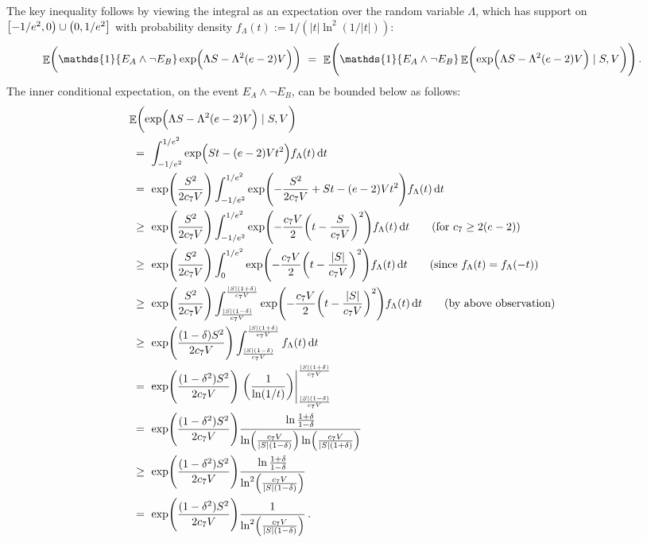 \documentclass[11pt]{article}
\DeclareMathOperator{\E}{\mathbb{E}}
\theoremstyle{remark}
\theoremstyle{definition}
\renewcommand\abs[1]{|#1|} %
\newcommand\ind[1]{\ensuremath{\mathds{1}\{#1\}}}
\newcommand\Parens[1]{\mleft(#1\mright)}
\begin{document}
The key inequality follows by viewing the integral as an expectation
over the random variable $\Lambda$, which has support on
$\intco{-1/e^2,0} \cup \intoc{0,1/e^2}$ with probability density
$f_\Lambda(t) := 1/(\abs{t}\ln^2(1/\abs{t}))$:
\begin{align*}
  \E\Parens{
    \ind{E_A \wedge \neg E_B}
    \exp\Parens{ \Lambda S - \Lambda^2 (e-2) V }
  }
  & \ = \
  \E\Parens{
    \ind{E_A \wedge \neg E_B}
    \E\Parens{
      \exp\Parens{ \Lambda S - \Lambda^2 (e-2) V }
      \mid S,V
    }
  }
  \,.
\end{align*}
The inner conditional expectation, on the event $E_A \wedge \neg E_B$,
can be bounded below as follows:
\begin{align*}
  \lefteqn{
    \E\Parens{
      \exp\Parens{ \Lambda S - \Lambda^2 (e-2) V }
      \mid S,V
    }
  } \\
  & \ = \
  \int_{-1/e^2}^{1/e^2}
  \exp\Parens{ S t - (e-2) V t^2 }
  f_\Lambda(t) \dif{t}
  \\
  & \ = \
  \exp\Parens{\frac{S^2}{2c_7V}}
  \int_{-1/e^2}^{1/e^2}
  \exp\Parens{
    -\frac{S^2}{2c_7V}
    + S t - (e-2) V t^2
  }
  f_\Lambda(t) \dif{t}
  \\
  & \ \geq \
  \exp\Parens{\frac{S^2}{2c_7V}}
  \int_{-1/e^2}^{1/e^2}
  \exp\Parens{
    -\frac{c_7V}{2}
    \Parens{ t - \frac{S}{c_7V} }^2
  }
  f_\Lambda(t) \dif{t}
  \qquad \text{(for $c_7 \geq 2(e-2)$)}
  \\
  & \ \geq \
  \exp\Parens{\frac{S^2}{2c_7V}}
  \int_0^{1/e^2}
  \exp\Parens{
    -\frac{c_7V}{2}
    \Parens{ t - \frac{|S|}{c_7V} }^2
  }
  f_\Lambda(t) \dif{t}
  \qquad \text{(since $f_\Lambda(t) = f_\Lambda(-t)$)}
  \\
  & \ \geq \
  \exp\Parens{\frac{S^2}{2c_7V}}
  \int_{\frac{|S|(1-\delta)}{c_7V}}^{\frac{|S|(1+\delta)}{c_7V}}
  \exp\Parens{
    -\frac{c_7V}{2}
    \Parens{ t - \frac{|S|}{c_7V} }^2
  }
  f_\Lambda(t) \dif{t}
  \qquad \text{(by above observation)}
  \\
  & \ \geq \
  \exp\Parens{\frac{(1-\delta)S^2}{2c_7V}}
  \int_{\frac{|S|(1-\delta)}{c_7V}}^{\frac{|S|(1+\delta)}{c_7V}}
  f_\Lambda(t) \dif{t}
  \\
  & \ = \
  \exp\Parens{\frac{(1-\delta^2)S^2}{2c_7V}}
  \left.
  \Parens{
    \frac{1}{\ln(1/t)}
  }
  \right\vert_{\frac{|S|(1-\delta)}{c_7V}}^{\frac{|S|(1+\delta)}{c_7V}}
  \\
  & \ = \
  \exp\Parens{\frac{(1-\delta^2)S^2}{2c_7V}}
  \frac{\ln\frac{1+\delta}{1-\delta}}
  {\ln\Parens{\frac{c_7V}{|S|(1-\delta)}}\ln\Parens{\frac{c_7V}{|S|(1+\delta)}}}
  \\
  & \ \geq \
  \exp\Parens{\frac{(1-\delta^2)S^2}{2c_7V}}
  \frac{\ln\frac{1+\delta}{1-\delta}}
  {\ln^2\Parens{\frac{c_7V}{|S|(1-\delta)}}}
  \\
  & \ = \
  \exp\Parens{\frac{(1-\delta^2)S^2}{2c_7V}}
  \frac{1}{\ln^2\Parens{\frac{c_7V}{|S|(1-\delta)}}}
  \,.
\end{align*}
\end{document}
